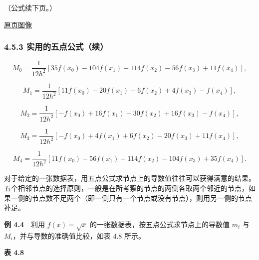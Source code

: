 \documentclass[
  10pt,
  fontset=fandol]{ctexart}
\begin{document}
（公式续下页。）

\href{../../source-images/pdf-116.jpeg}{原页图像}

\subsubsection{4.5.3 实用的五点公式（续）}\label{ux5b9eux7528ux7684ux4e94ux70b9ux516cux5f0fux7eed}

\[
M_0=\frac1{12h^2}[35f(x_0)-104f(x_1)+114f(x_2)-56f(x_3)+11f(x_4)],
\]

\[
M_1=\frac1{12h^2}[11f(x_0)-20f(x_1)+6f(x_2)+4f(x_3)-f(x_4)],
\]

\[
M_2=\frac1{12h^2}[-f(x_0)+16f(x_1)-30f(x_2)+16f(x_3)-f(x_4)],
\]

\[
M_3=\frac1{12h^2}[-f(x_0)+4f(x_1)+6f(x_2)-20f(x_3)+11f(x_4)],
\]

\[
M_4=\frac1{12h^2}[11f(x_0)-56f(x_1)+114f(x_2)-104f(x_3)+35f(x_4)].
\]

对于给定的一张数据表，用五点公式求节点上的导数值往往可以获得满意的结果。五个相邻节点的选择原则，一般是在所考察的节点的两侧各取两个邻近的节点，如果一侧的节点数不足两个（即一侧只有一个节点或没有节点），则用另一侧的节点补足。

\textbf{例 4.4}　利用 \(f(x)=\sqrt{x}\) 的一张数据表，按五点公式求节点上的导数值 \(m_i\) 与 \(M_i\)，并与导数的准确值比较，如表 4.8 所示。

\textbf{表 4.8}
\end{document}
